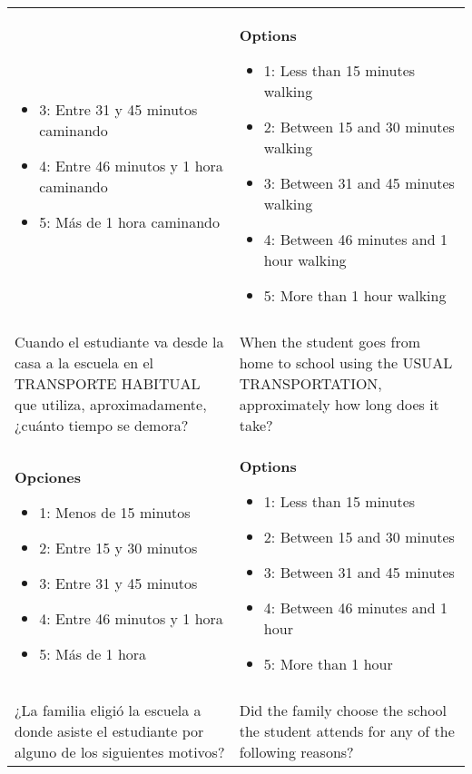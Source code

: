 \documentclass[11pt]{article}
\begin{document}
\begin{longtable}{@{}LL@{}}
\begin{itemize}[leftmargin=*]
\item 3: Entre 31 y 45 minutos caminando
\item 4: Entre 46 minutos y 1 hora caminando
\item 5: Más de 1 hora caminando\end{itemize} & \textbf{Options}\par\begin{itemize}[leftmargin=*]\item 1: Less than 15 minutes walking
\item 2: Between 15 and 30 minutes walking
\item 3: Between 31 and 45 minutes walking
\item 4: Between 46 minutes and 1 hour walking
\item 5: More than 1 hour walking\end{itemize} \\
\addlinespace[4pt]
 \\ 
Cuando el estudiante va desde la casa a la escuela en el TRANSPORTE HABITUAL que utiliza, aproximadamente, ¿cuánto tiempo se demora? & When the student goes from home to school using the USUAL TRANSPORTATION, approximately how long does it take? \\
\textbf{Opciones}\par\begin{itemize}[leftmargin=*]\item 1: Menos de 15 minutos
\item 2: Entre 15 y 30 minutos
\item 3: Entre 31 y 45 minutos
\item 4: Entre 46 minutos y 1 hora
\item 5: Más de 1 hora\end{itemize} & \textbf{Options}\par\begin{itemize}[leftmargin=*]\item 1: Less than 15 minutes
\item 2: Between 15 and 30 minutes
\item 3: Between 31 and 45 minutes
\item 4: Between 46 minutes and 1 hour
\item 5: More than 1 hour\end{itemize} \\
\addlinespace[4pt]
 \\ 
¿La familia eligió la escuela a donde asiste el estudiante por alguno de los siguientes motivos? & Did the family choose the school the student attends for any of the following reasons? \\

\end{longtable}
\end{document}
